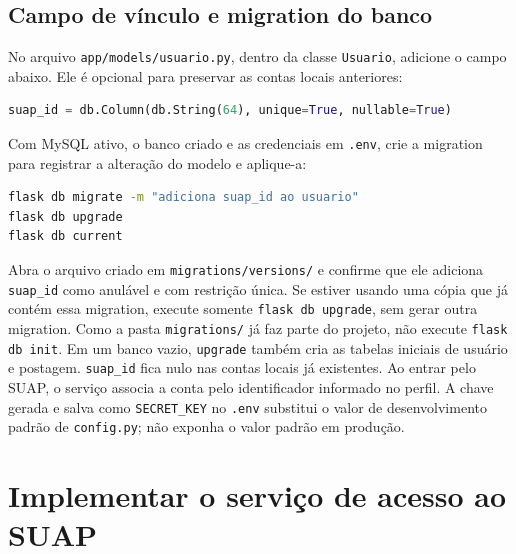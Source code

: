 \documentclass[11pt,a4paper]{article}
\begin{document}
\subsection{Campo de vínculo e migration do banco}
No arquivo \texttt{app/models/usuario.py}, dentro da classe \texttt{Usuario}, adicione o campo abaixo. Ele é opcional para preservar as contas locais anteriores:
\begin{lstlisting}[language=Python]
suap_id = db.Column(db.String(64), unique=True, nullable=True)
\end{lstlisting}
Com MySQL ativo, o banco criado e as credenciais em \texttt{.env}, crie a migration para registrar a alteração do modelo e aplique-a:
\begin{lstlisting}[language=bash]
flask db migrate -m "adiciona suap_id ao usuario"
flask db upgrade
flask db current
\end{lstlisting}
Abra o arquivo criado em \texttt{migrations/versions/} e confirme que ele adiciona \texttt{suap\_id} como anulável e com restrição única. Se estiver usando uma cópia que já contém essa migration, execute somente \texttt{flask db upgrade}, sem gerar outra migration. Como a pasta \texttt{migrations/} já faz parte do projeto, não execute \texttt{flask db init}. Em um banco vazio, \texttt{upgrade} também cria as tabelas iniciais de usuário e postagem.
\texttt{suap\_id} fica nulo nas contas locais já existentes. Ao entrar pelo SUAP, o serviço associa a conta pelo identificador informado no perfil. A chave gerada e salva como \texttt{SECRET\_KEY} no \texttt{.env} substitui o valor de desenvolvimento padrão de \texttt{config.py}; não exponha o valor padrão em produção.

\clearpage
\section{Implementar o serviço de acesso ao SUAP}
\end{document}
